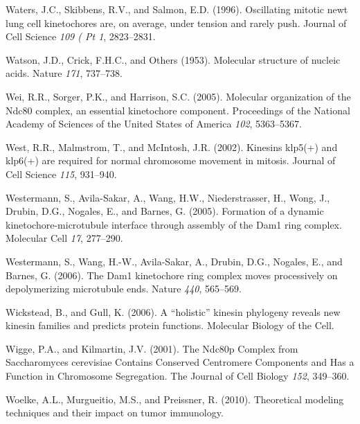 \documentclass[12pt,a4paper,twoside,openright]{book}
\begin{document}
Waters, J.C., Skibbens, R.V., and Salmon, E.D. (1996). Oscillating
mitotic newt lung cell kinetochores are, on average, under tension and
rarely push. Journal of Cell Science \emph{109 ( Pt 1}, 2823--2831.

Watson, J.D., Crick, F.H.C., and Others (1953). Molecular structure of
nucleic acids. Nature \emph{171}, 737--738.

Wei, R.R., Sorger, P.K., and Harrison, S.C. (2005). Molecular
organization of the Ndc80 complex, an essential kinetochore component.
Proceedings of the National Academy of Sciences of the United States of
America \emph{102}, 5363--5367.

West, R.R., Malmstrom, T., and McIntosh, J.R. (2002). Kinesins klp5(+)
and klp6(+) are required for normal chromosome movement in mitosis.
Journal of Cell Science \emph{115}, 931--940.

Westermann, S., Avila-Sakar, A., Wang, H.W., Niederstrasser, H., Wong,
J., Drubin, D.G., Nogales, E., and Barnes, G. (2005). Formation of a
dynamic kinetochore-microtubule interface through assembly of the Dam1
ring complex. Molecular Cell \emph{17}, 277--290.

Westermann, S., Wang, H.-W., Avila-Sakar, A., Drubin, D.G., Nogales, E.,
and Barnes, G. (2006). The Dam1 kinetochore ring complex moves
processively on depolymerizing microtubule ends. Nature \emph{440},
565--569.

Wickstead, B., and Gull, K. (2006). A ``holistic'' kinesin phylogeny
reveals new kinesin families and predicts protein functions. Molecular
Biology of the Cell.

Wigge, P.A., and Kilmartin, J.V. (2001). The Ndc80p Complex from
Saccharomyces cerevisiae Contains Conserved Centromere Components and
Has a Function in Chromosome Segregation. The Journal of Cell Biology
\emph{152}, 349--360.

Woelke, A.L., Murgueitio, M.S., and Preissner, R. (2010). Theoretical
modeling techniques and their impact on tumor immunology.
\end{document}
